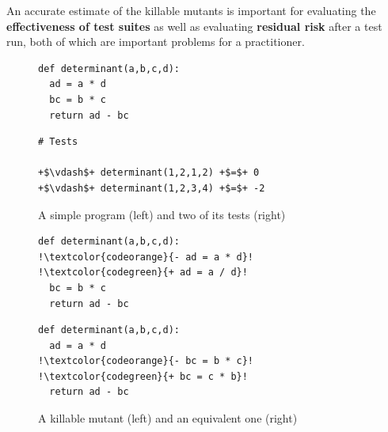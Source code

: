 \documentclass[sigconf,review,anonymous]{acmart}
\begin{document}
\begin{tcolorbox}[boxrule=0.5pt, arc=4pt, boxsep=0pt, width=\columnwidth]
An accurate estimate of the killable mutants is important for evaluating the \textbf{effectiveness
of test suites} as well as evaluating \textbf{residual risk} after a test run, both of which are important problems for a practitioner.
\end{tcolorbox}

%
%
%
%
\begin{figure}[t]
\begin{minipage}{.45\columnwidth}  %
\begin{lstlisting}[style=python]
def determinant(a,b,c,d):
  ad = a * d
  bc = b * c
  return ad - bc
\end{lstlisting}
\end{minipage}
\hfill
\begin{minipage}{0.5\columnwidth} %
\begin{lstlisting}[style=python,escapechar=+, numbers=none]
# Tests

+$\vdash$+ determinant(1,2,1,2) +$=$+ 0
+$\vdash$+ determinant(1,2,3,4) +$=$+ -2
\end{lstlisting}
\end{minipage}
\caption{A simple program (left) and two of its tests (right)}
\label{fig:working-example}
\vspace*{-5mm}
\end{figure}
%
\begin{figure}[t]
\begin{minipage}{.45\columnwidth}  %
\begin{lstlisting}[style=python,escapechar=!]
def determinant(a,b,c,d):
!\textcolor{codeorange}{- ad = a * d}!
!\textcolor{codegreen}{+ ad = a / d}!
  bc = b * c
  return ad - bc
\end{lstlisting}
\end{minipage}
\hfill
\begin{minipage}{0.5\columnwidth} %
\begin{lstlisting}[style=python,escapechar=!, numbers=none]
def determinant(a,b,c,d):
  ad = a * d
!\textcolor{codeorange}{- bc = b * c}!
!\textcolor{codegreen}{+ bc = c * b}!
  return ad - bc
\end{lstlisting}
\end{minipage}
\caption{A killable mutant (left) and an equivalent one (right)}
\label{fig:working-example-mutants}
\vspace*{-6mm}
\end{figure}
\end{document}
